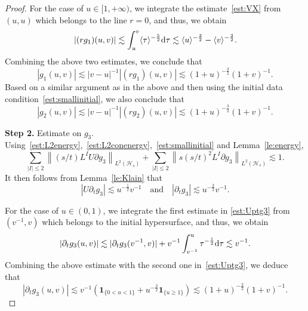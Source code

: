 \documentclass[a4paper,reqno]{amsart}
\theoremstyle{definition}
\numberwithin{equation}{section}
\def \d {{\rm{d}}}
\begin{document}
\begin{proof}
For the case of $u\in [1,+\infty)$, we integrate the estimate~\eqref{est:VX} from $(u,u)$ which belongs to the line $r=0$, and thus, we obtain 
\begin{equation*}
    \left|(rg_{1})(u,v)\right|\lesssim 
    \int_{u}^{v}\langle \tau \rangle^{-\frac{5}{2}}\d \tau\lesssim 
    \langle u\rangle^{-\frac{3}{2}}-\langle v\rangle^{-\frac{3}{2}}.
\end{equation*}
Combining the above two estimates, we conclude that 
\begin{equation}\label{est:g1}
    |g_{1}(u,v)|\lesssim |v-u|^{-1}|(rg_{1})(u,v)|\lesssim (1+u)^{-\frac{3}{2}}(1+v)^{-1}.
\end{equation}
Based on a similar argument as in the above and then using the initial data condition~\eqref{est:smallinitial}, we also conclude that 
\begin{equation}\label{est:g2}
    |g_{2}(u,v)|\lesssim |v-u|^{-1}|(rg_{2})(u,v)|\lesssim (1+u)^{-\frac{3}{2}}(1+v)^{-1}.
\end{equation}

\textbf{Step 2.} Estimate on $g_{3}$.
Using~\eqref{est:L2energy},~\eqref{est:L2conenergy},~\eqref{est:smallinitial} and Lemma~\ref{le:energy}, 
\begin{equation*}
    \sum_{|I|\le 2}\left\|(s/t)L^{I}U\partial g_{3}\right\|_{L^{2}(\mathcal{H}_{s})}+\sum_{|I|\le 2}\left\|s(s/t)^{2}L^{I}\partial g_{3}\right\|_{L^{2}(\mathcal{H}_{s})}\lesssim 1.
\end{equation*}
It then follows from Lemma~\ref{le:Klain} that 
\begin{equation}\label{est:Uptg3}
    |U\partial_{t} g_{3}|\lesssim u^{-\frac{1}{2}}v^{-1}\quad \mbox{and}\quad 
    |\partial_{t} g_{3}|\lesssim u^{-\frac{3}{2}}v^{-1}.
\end{equation}

For the case of $u\in (0,1)$, we integrate the first estimate in \eqref{est:Uptg3} from $(v^{-1},v)$ which belongs to the initial hypersurface, and thus, we obtain 
\begin{equation*}
   \left| \partial_{t}g_{3}(u,v)\right|\lesssim |\partial_{t}g_{3}(v^{-1},v)|+v^{-1}\int_{v^{-1}}^{u}\tau^{-\frac{1}{2}}\d \tau \lesssim v^{-1}.
\end{equation*}
Combining the above estimate with the second one in~\eqref{est:Uptg3}, we deduce that 
\begin{equation}\label{est:g3}
    |\partial_{t}g_{3}(u,v)|\lesssim
    v^{-1}\left(\textbf{1}_{\{0<u<1\}}+u^{-\frac{3}{2}}\textbf{1}_{\{u\ge 1\}}\right)
    \lesssim
    (1+u)^{-\frac{3}{2}}(1+v)^{-1}.
\end{equation}


\end{proof}
\end{document}
